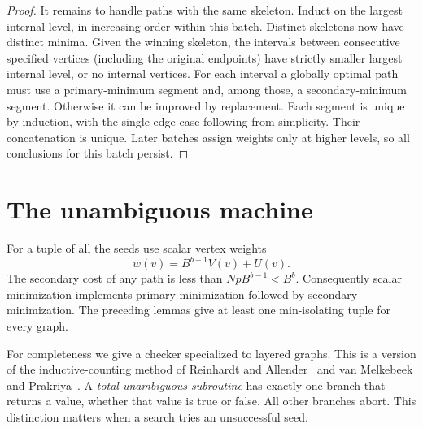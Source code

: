 \documentclass[11pt]{article}
\begin{document}
\begin{proof}
It remains to handle paths with the same skeleton. Induct on the largest internal level, in increasing order within this batch. Distinct skeletons now have distinct minima. Given the winning skeleton, the intervals between consecutive specified vertices (including the original endpoints) have strictly smaller largest internal level, or no internal vertices. For each interval a globally optimal path must use a primary-minimum segment and, among those, a secondary-minimum segment. Otherwise it can be improved by replacement. Each segment is unique by induction, with the single-edge case following from simplicity. Their concatenation is unique. Later batches assign weights only at higher levels, so all conclusions for this batch persist.
\end{proof}

\section{The unambiguous machine}

For a tuple of all the seeds use scalar vertex weights
\[
                         w(v)=B^{b+1} V(v)+U(v).
\]
The secondary cost of any path is less than $NpB^{b-1}<B^b$. Consequently scalar minimization implements primary minimization followed by secondary minimization. The preceding lemmas give at least one min-isolating tuple for every graph.

For completeness we give a checker specialized to layered graphs. This is a version of the inductive-counting method of Reinhardt and Allender~\cite{RA} and van Melkebeek and Prakriya~\cite[Lemma 3.5]{vMP}. A \emph{total unambiguous subroutine} has exactly one branch that returns a value, whether that value is true or false. All other branches abort. This distinction matters when a search tries an unsuccessful seed.
\end{document}

